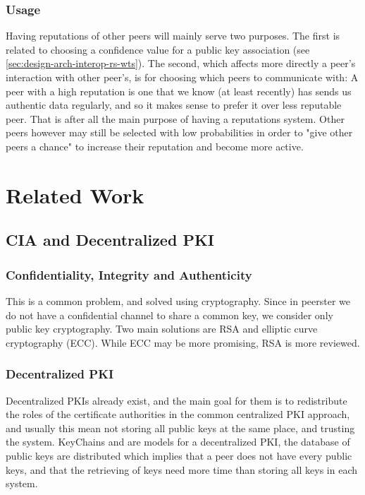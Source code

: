\documentclass[]{article}
\begin{document}
\subsubsection{Usage}
Having reputations of other peers will mainly serve two purposes.
The first is related to choosing a confidence value for a public key association (see \ref{sec:design-arch-interop-rs-wts}).
The second, which affects more directly a peer's interaction with other peer's, is for choosing which peers to communicate with:
A peer with a high reputation is one that we know (at least recently) has sends us authentic data regularly, and so it makes sense to prefer it over less reputable peer.
That is after all the main purpose of having a reputations system.
Other peers however may still be selected with low probabilities in order to "give other peers a chance" to increase their reputation and become more active.

\section{Related Work}

\subsection{CIA and Decentralized PKI}

\subsubsection{Confidentiality, Integrity and Authenticity}
This is a common problem, and solved using cryptography. Since in peerster we do not have a confidential channel to share a common key, we consider only public key cryptography. Two main solutions are RSA \cite{RFC8017} and elliptic curve cryptography (ECC). While ECC may be more promising, RSA is more reviewed.

\subsubsection{Decentralized PKI}
Decentralized PKIs already exist, and the main goal for them is to redistribute the roles of the certificate authorities in the common centralized PKI approach, and usually this mean not storing all public keys at the same place, and trusting the system. KeyChains \cite{morselli2006keychains} and \cite{aberer2005decentralised} are models for a decentralized PKI, the database of public keys are distributed which implies that a peer does not have every public keys, and that the retrieving of keys need more time than storing all keys in each system.
\end{document}
